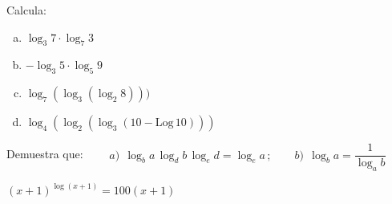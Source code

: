\begin{mipropuesto}
	
	Calcula:

\begin{multicols}{2}	
\begin{enumerate}[a) ]
	\item $\log_3 7\cdot \log_7 3$
	\item $-\log_3 5 \cdot \log_5 9$
	\item $\log_7(\log_3(\log_2 8)))$
	\item $\log_4(\log_2(\log_3(10-\mathrm{Log}\, 10)))$
\end{enumerate}
\end{multicols}
\vspace{1mm}	

\end{mipropuesto}

\vspace{-8mm}
\begin{flushright}
\begin{footnotesize} \textcolor{gris}{}	\end{footnotesize}
\end{flushright}

\vspace{-8mm}
\begin{flushright}
\begin{footnotesize} \textcolor{gris}{}	\end{footnotesize}
\end{flushright}


\begin{mipropuesto}

Demuestra que: 
$\qquad a)\ \ \log_ba\, \log_db\, \log_ed=\log_ea\, ; \qquad b)\ \ \log_ba=\dfrac{1}{\log_ab}$ 	
\end{mipropuesto}

\vspace{-8mm}
\begin{flushright}
\begin{footnotesize} \textcolor{gris}{}	\end{footnotesize}
\end{flushright}


\begin{mipropuesto}

$(x+1)^{\log(x+1)}=100(x+1)$	
\end{mipropuesto}

